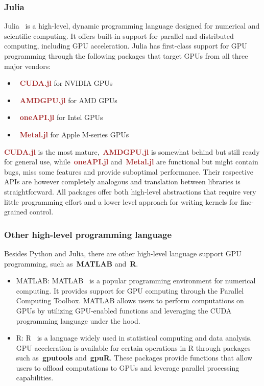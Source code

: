 \subsubsection{Julia}


\par
Julia~\cite{julia} is a high-level, dynamic programming language designed for numerical and scientific computing.
It offers built-in support for parallel and distributed computing, including GPU acceleration.
Julia has first-class support for GPU programming through the following packages that target GPUs from all three major vendors:
\begin{itemize}
    \item~\textbf{\textcolor{brown}{CUDA.jl}} for NVIDIA GPUs~\cite{cudajl}
    \item~\textbf{\textcolor{brown}{AMDGPU.jl}} for AMD GPUs~\cite{amdgpujl}
    \item~\textbf{\textcolor{brown}{oneAPI.jl}} for Intel GPUs~\cite{oneapijl}
    \item~\textbf{\textcolor{brown}{Metal.jl}} for Apple M-series GPUs~\cite{metaljl}
\end{itemize}

\par
\textbf{\textcolor{brown}{CUDA.jl}} is the most mature,~\textbf{\textcolor{brown}{AMDGPU.jl}} is somewhat behind but still ready for general use, while~\textbf{\textcolor{brown}{oneAPI.jl}} and~\textbf{\textcolor{brown}{Metal.jl}} are functional but might contain bugs, miss some features and provide suboptimal performance.
Their respective APIs are however completely analogous and translation between libraries is straightforward.
All packages offer both high-level abstractions that require very little programming effort and a lower level approach for writing kernels for fine-grained control.


\subsubsection{Other high-level programming language}


Besides Python and Julia, there are other high-level language support GPU programming, such as~\textbf{MATLAB} and~\textbf{R}.
\begin{itemize}
    \item MATLAB: MATLAB~\cite{matlab} is a popular programming environment for numerical computing. It provides support for GPU computing through the Parallel Computing Toolbox. MATLAB allows users to perform computations on GPUs by utilizing GPU-enabled functions and leveraging the CUDA programming language under the hood.
    \item R: R~\cite{rproject} is a language widely used in statistical computing and data analysis. GPU acceleration is available for certain operations in R through packages such as~\textbf{gputools} and~\textbf{gpuR}. These packages provide functions that allow users to offload computations to GPUs and leverage parallel processing capabilities.
\end{itemize}


